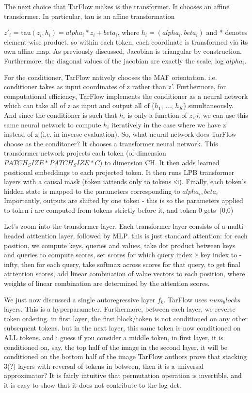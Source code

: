 \documentclass[12pt,a4paper]{report}
\begin{document}
The next choice that TarFlow makes is the transformer. It chooses an affine transformer. 
In particular, tau is an affine transformation

$z'_i$ = tau$(z_i, h_i) = alpha_i * z_i + beta_i$, where $h_i = (alpha_i, beta_i)$
and * denotes element-wise product. 
so within each token, each coordinate is transformed via its own affine map. 
As previously discussed, Jacobian is triangular by construction. 
Furthermore, the diagonal values of the jacobian are exactly the scale, log $alpha_i$. 

For the conditioner, TarFlow natively chooses the MAF orientation. i.e. conditioner takes as input coordinates of z rather than z'. 
Furthermore, for computational efficiency, TarFlow implements the conditioner as a neural network which can take all of z as input and output all of ($h_1$, ..., $h_K$) simultaneously. 
And since the conditioner is such that $h_i$ is only a function of $z_<i$, we can use this same neural network to compute $h_i$ iteratively in the case where we have z' instead of z (i.e. in inverse evaluation). 
So, what neural network does TarFlow choose as the conditoner?
It chooses a transformer neural network. 
This transformer network projects each token (of dimension $PATCH_SIZE*PATCH_SIZE*C$) to dimension CH. 
It then adds learned positional embeddings to each projected token. 
It then runs LPB transformer layers with a causal mask (token iattends only to tokens ≤i). 
Finally, each token's hidden state is mapped to the parameters corresponding to $alpha_i, beta_i$
Importantly, outputs are shifted by one token - this is so the parameters applied to token i are computed from tokens strictly before it, and token 0 gets (0,0)

Let's zoom into the transformer layer. 
Each transformer layer consists of a multi-headed atttention layer, followed by MLP. 
this is just standard attention: for each position, we compute keys, queries and values, take dot product between keys and queries to compute scores, set scores for which query index ≥ key index to -infty, then for each query, take softmax across scores for that query, to get final atttention scores, add linear combination of value vectors to each position, where weights of linear combination are determined by the attention scores.  

We just now discussed a single autoregressive layer $f_k$. TarFlow uses $num_blocks$ layers. This is a hyperparameter. 
Furthermore, between each layer, we reverse token ordering. 
in first layer, the first block/token is not conditioned on any other subsequent tokens. 
but in the next layer, this same token is now conditioned on ALL tokens.
and i guess if you consider a middle token, in first layer, it is conditioned on, say, the top half of the image
in the second layer, it will be conditioned on the bottom half of the image
TarFlow authors prove that stacking 3(?) layers with reversal of tokens in between, then it is a universal approximator?
It is fairly intuitive that permutation operation is invertible, and it is easy to show that it does not contribute to the log det. %
\end{document}
